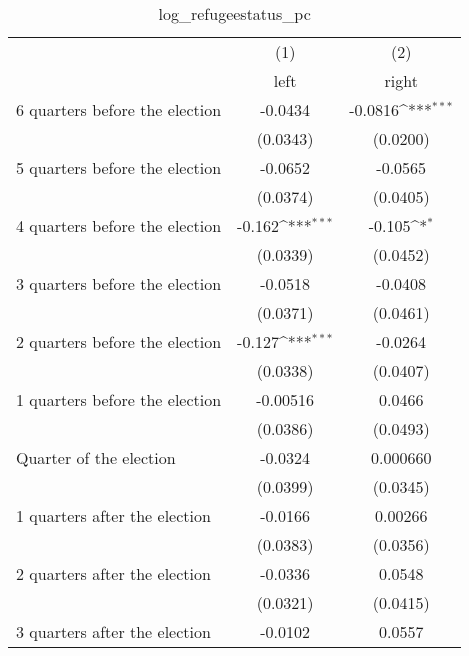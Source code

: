 \begin{table}[htbp]\centering
\def\sym#1{\ifmmode^{#1}\else\(^{#1}\)\fi}
\caption{log\_refugeestatus\_pc}
\begin{tabular}{l*{2}{c}}
\hline\hline
                    &\multicolumn{1}{c}{(1)}&\multicolumn{1}{c}{(2)}\\
                    &\multicolumn{1}{c}{left}&\multicolumn{1}{c}{right}\\
\hline
 6 quarters before the election&     -0.0434         &     -0.0816\sym{***}\\
                    &    (0.0343)         &    (0.0200)         \\
[1em]
 5 quarters before the election&     -0.0652         &     -0.0565         \\
                    &    (0.0374)         &    (0.0405)         \\
[1em]
 4 quarters before the election&      -0.162\sym{***}&      -0.105\sym{*}  \\
                    &    (0.0339)         &    (0.0452)         \\
[1em]
 3 quarters before the election&     -0.0518         &     -0.0408         \\
                    &    (0.0371)         &    (0.0461)         \\
[1em]
 2 quarters before the election&      -0.127\sym{***}&     -0.0264         \\
                    &    (0.0338)         &    (0.0407)         \\
[1em]
 1 quarters before the election&    -0.00516         &      0.0466         \\
                    &    (0.0386)         &    (0.0493)         \\
[1em]
Quarter of the election&     -0.0324         &    0.000660         \\
                    &    (0.0399)         &    (0.0345)         \\
[1em]
 1 quarters after the election&     -0.0166         &     0.00266         \\
                    &    (0.0383)         &    (0.0356)         \\
[1em]
 2 quarters after the election&     -0.0336         &      0.0548         \\
                    &    (0.0321)         &    (0.0415)         \\
[1em]
 3 quarters after the election&     -0.0102         &      0.0557         \\

\end{tabular}
\end{table}
